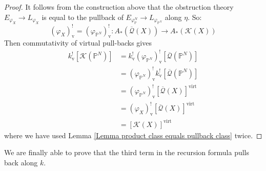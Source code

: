 \documentclass[11pt]{amsart}
\newcommand{\PP}{\mathbb P}
\renewcommand{\to}{\rightarrow}
\newcommand{\virt}[1]{[#1]^{\operatorname{virt}}}
\newcommand{\om}[1]{\overline{\mathcal{#1}}}
\theoremstyle{plain}
\theoremstyle{definition}
\begin{document}
\begin{proof} It follows from the construction above that the obstruction theory $E_{\varphi_X} \to L_{\varphi_X}$ is equal to the pullback of $E_{\varphi_\PP^N} \to L_{\varphi_{\PP^N}}$ along $\eta$. So:
\begin{equation*} (\varphi_X)_{\text{v}}^! = (\varphi_{\PP^N})_{\text{v}}^! : A_*(\om{Q}(X)) \to A_*(\mathcal{K}(X)) \end{equation*}
Then commutativity of virtual pull-backs gives
\begin{align*} k_{\text{v}}^! [\mathcal{K}(\PP^N)] & = k_{\text{v}}^! (\varphi_{\PP^N})_{\text{v}}^! [\om{Q}(\PP^N)] \\
& = (\varphi_{\PP^N})_{\text{v}}^! k_{\text{v}}^! [ \om{Q}(\PP^N) ] \\
& = (\varphi_{\PP^N})_{\text{v}}^! \virt{\om{Q}(X)} \\
& = (\varphi_X)_{\text{v}}^! \virt{\om{Q}(X)} \\
& = \virt{\mathcal{K}(X)}
\end{align*}
where we have used Lemma \ref{Lemma product class equals pullback class} twice. \end{proof}

We are finally able to prove that the third term in the recursion formula pulls back along $k$.
\end{document}
